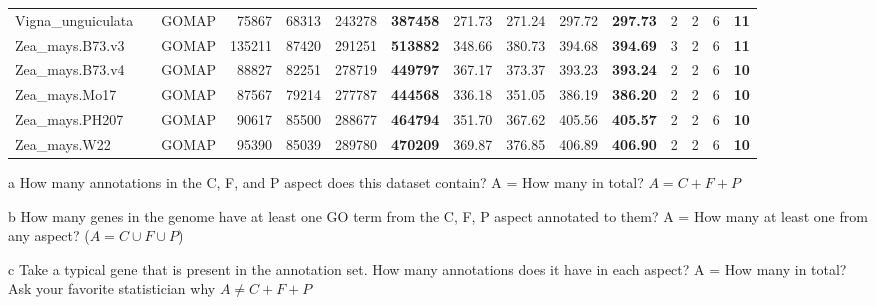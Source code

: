 \documentclass[]{article}
\begin{document}
\begin{table}[t]
{\begin{threeparttable}
\begin{tabular}{lrlrrr>{\bfseries}r|rrr>{\bfseries}r|rrr>{\bfseries}r}
\rowcolor{gray!6}  Vigna\_unguiculata &  & GOMAP & 75867 & 68313 & 243278 & 387458 & 271.73 & 271.24 & 297.72 & 297.73 & 2 & 2 & 6 & 11\\

Zea\_mays.B73.v3 &  & GOMAP & 135211 & 87420 & 291251 & 513882 & 348.66 & 380.73 & 394.68 & 394.69 & 3 & 2 & 6 & 11\\

\rowcolor{gray!6}  Zea\_mays.B73.v4 &  & GOMAP & 88827 & 82251 & 278719 & 449797 & 367.17 & 373.37 & 393.23 & 393.24 & 2 & 2 & 6 & 10\\

Zea\_mays.Mo17 &  & GOMAP & 87567 & 79214 & 277787 & 444568 & 336.18 & 351.05 & 386.19 & 386.20 & 2 & 2 & 6 & 10\\

\rowcolor{gray!6}  Zea\_mays.PH207 &  & GOMAP & 90617 & 85500 & 288677 & 464794 & 351.70 & 367.62 & 405.56 & 405.57 & 2 & 2 & 6 & 10\\

Zea\_mays.W22 & \multirow{-14}{*}{\raggedleft\arraybackslash 100} & GOMAP & 95390 & 85039 & 289780 & 470209 & 369.87 & 376.85 & 406.89 & 406.90 & 2 & 2 & 6 & 10\\
\bottomrule
\end{tabular}
\begin{tablenotes}
\item[a] How many annotations in the C, F, and P aspect does this dataset contain? A = How many in total? $A = C + F + P$
\item[b] How many genes in the genome have at least one GO term from the C, F, P aspect annotated to them? A = How many at least one from any aspect? ($A = C \cup F \cup P$)
\item[c] Take a typical gene that is present in the annotation set. How many annotations does it have in each aspect? A = How many in total? Ask your favorite statistician why $A \neq C + F +P$
\end{tablenotes}
\end{threeparttable}}
\end{table}
\end{document}
